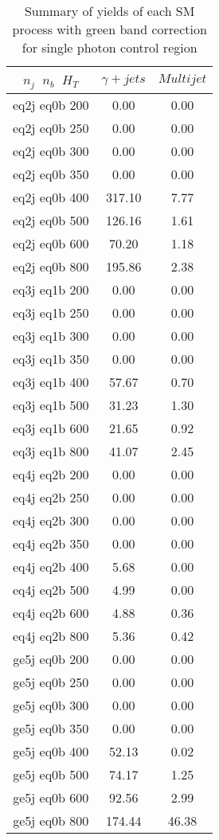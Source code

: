 

\begin{longtable}{| c | c | c  | }
\caption{Summary of yields of each SM process with green band correction for single photon control region} \label{tab:yieldSM-singlephoton} \\    \hline 
$n_{j}$~$n_{b}$~$H_{T}$ & $\gamma+jets$ & $Multijet$\\ \hline 
eq2j eq0b 200 & 0.00 & 0.00\\ \hline 
eq2j eq0b 250 & 0.00 & 0.00\\ \hline 
eq2j eq0b 300 & 0.00 & 0.00\\ \hline 
eq2j eq0b 350 & 0.00 & 0.00\\ \hline 
eq2j eq0b 400 & 317.10 & 7.77\\ \hline 
eq2j eq0b 500 & 126.16 & 1.61\\ \hline 
eq2j eq0b 600 & 70.20 & 1.18\\ \hline 
eq2j eq0b 800 & 195.86 & 2.38\\ \hline 
eq3j eq1b 200 & 0.00 & 0.00\\ \hline 
eq3j eq1b 250 & 0.00 & 0.00\\ \hline 
eq3j eq1b 300 & 0.00 & 0.00\\ \hline 
eq3j eq1b 350 & 0.00 & 0.00\\ \hline 
eq3j eq1b 400 & 57.67 & 0.70\\ \hline 
eq3j eq1b 500 & 31.23 & 1.30\\ \hline 
eq3j eq1b 600 & 21.65 & 0.92\\ \hline 
eq3j eq1b 800 & 41.07 & 2.45\\ \hline 
eq4j eq2b 200 & 0.00 & 0.00\\ \hline 
eq4j eq2b 250 & 0.00 & 0.00\\ \hline 
eq4j eq2b 300 & 0.00 & 0.00\\ \hline 
eq4j eq2b 350 & 0.00 & 0.00\\ \hline 
eq4j eq2b 400 & 5.68 & 0.00\\ \hline 
eq4j eq2b 500 & 4.99 & 0.00\\ \hline 
eq4j eq2b 600 & 4.88 & 0.36\\ \hline 
eq4j eq2b 800 & 5.36 & 0.42\\ \hline 
ge5j eq0b 200 & 0.00 & 0.00\\ \hline 
ge5j eq0b 250 & 0.00 & 0.00\\ \hline 
ge5j eq0b 300 & 0.00 & 0.00\\ \hline 
ge5j eq0b 350 & 0.00 & 0.00\\ \hline 
ge5j eq0b 400 & 52.13 & 0.02\\ \hline 
ge5j eq0b 500 & 74.17 & 1.25\\ \hline 
ge5j eq0b 600 & 92.56 & 2.99\\ \hline 
ge5j eq0b 800 & 174.44 & 46.38\\ \hline 
    \hline 
    \hline 
\end{longtable}

